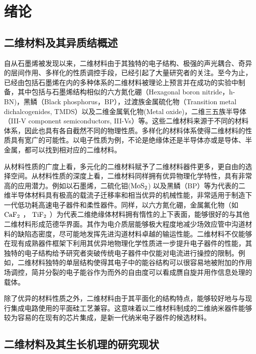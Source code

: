 \chapter{绪\hspace{6pt}论}

\section{二维材料及其异质结概述}
自从石墨烯被发现以来，二维材料由于其独特的电子结构、极强的声光耦合、奇异的层间作用、多样化的性质调控手段，已经引起了大量研究者的关注。至今为止，已经由包括石墨烯在内的多种体系的二维材料被理论上预言并在成功的实验中制备，其中包括与石墨烯结构相似的六方氮化硼（Hexagonal boron nitride，h-BN)，黑鳞（Black phosphorus，BP），过渡族金属硫化物（Transition metal dichalcogenides, TMDS）以及二维金属氧化物(Metal oxide)，二维三五族半导体（III-V component semiconductors, III-Vs）等。这些二维材料来源于不同的材料体系，因此也具有各自截然不同的物理性质。多样化的材料体系使得二维材料的性质具有宽广的可能性。以电子性质为例，不论是绝缘体还是半导体亦或是导体、半金属，都可以找到相对应的二维材料。

从材料性质的广度上看，多元化的二维材料赋予了二维材料器件更多，更自由的选择空间。从材料性质的深度上看，二维材料同样拥有优异物理化学特性，具有非常高的应用潜力。例如以石墨烯，二硫化钼($ \rm{MoS_{2}} $) 以及黑鳞（BP）等为代表的二维半导体材料具有极高的载流子迁移率和相当优异的机械性能，非常适用于制造下一代低功耗高速电子器件和柔性器件。同样，以六方氮化硼，金属氟化物（如 $ \rm{CaF_{2}} $ ， $\rm{TiF_{2}}$ ）为代表二维绝缘体材料拥有惰性的上下表面，能够很好的与其他二维材料形成范德华界面。其作为电介质层能够极大程度地减少场效应管中沟道材料的缺陷态密度，尽可能地发挥先进沟道材料卓越的输运性能。二维材料不仅能够在现有成熟器件框架下利用其优异地物理化学性质进一步提升电子器件的性能，其独特的电子结构给予研究者突破传统电子器件中仅能对电流进行操控的限制。例如，二维材料独特的单层结构使得其电子中的能谷结构可以很容易地被附加的作用场调控，简并分裂的电子能谷作为而外的自由度可以看成赝自旋并用作信息处理的载体。

除了优异的材料性质之外，二维材料由于其平面化的结构特点，能够较好地与与现行集成电路使用的平面硅工艺兼容。这意味着以二维材料制成的二维纳米器件能够较为容易的在现有的芯片集成，是新一代纳米电子器件的候选材料。

\section{二维材料及其生长机理的研究现状}
